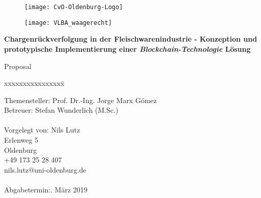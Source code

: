 \begin{titlepage}
  \begin{centering}
  \begin{figure}[h!]
    \centering
    \texttt{[image: CvO-Oldenburg-Logo]}    %
  \end{figure}

  \vspace*{-0.8cm}

  \begin{figure}[h!]
    \centering
    \texttt{[image: VLBA\_waagerecht]}    %
  \end{figure}

  \vspace*{0.4cm}

  \textsf{\Huge \textbf{Chargenrückverfolgung in der Fleischwarenindustrie - Konzeption und prototypische Implementierung einer \textit{Blockchain-Technologie} Lösung\\}}

  \vspace*{0.5cm}
  \noindent Proposal\\

  \end{centering}

  \vspace*{1.5cm}
  \begin{tabbing}
  xxxxxxxxxxxxxxxx\= \kill

  \small Themensteller:\> Prof. Dr.-Ing. Jorge Marx Gómez\\
  \small Betreuer:\> Stefan Wunderlich (M.Sc.)\\\\

  \small Vorgelegt von: \>Nils Lutz\\
  \small \>Erlenweg 5\\
  \small {} Oldenburg\\
  \small \>+49 173 25 28 407\\
  \small \>nils.lutz@uni-oldenburg.de\\\\

  \small Abgabetermin:. März 2019
  \end{tabbing}
\end{titlepage}
\newpage
